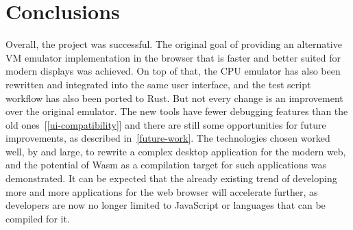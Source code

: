 \section{Conclusions}
Overall, the project was successful.
The original goal of providing an alternative VM emulator implementation in the browser that is faster and better suited for modern displays was achieved.
On top of that, the CPU emulator has also been rewritten and integrated into the same user interface, and the test script workflow has also been ported to Rust.
But not every change is an improvement over the original emulator.
The new tools have fewer debugging features than the old ones~[\ref{ui-compatibility}] and there are still some opportunities for future improvements, as described in~\cref{future-work}.
The technologies chosen worked well, by and large, to rewrite a complex desktop application for the modern web, and the potential of Wasm as a compilation target for such applications was demonstrated.
It can be expected that the already existing trend of developing more and more applications for the web browser will accelerate further, as developers are now no longer limited to JavaScript or languages that can be compiled for it.

